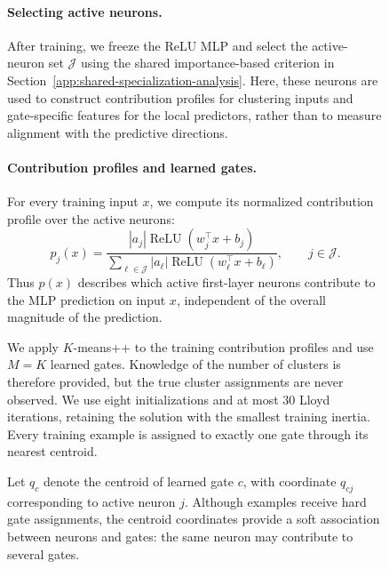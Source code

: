 \documentclass{article}
\newcounter{initialization}[section]
\begin{document}
\begin{figure}
\paragraph{Selecting active neurons.}
After training, we freeze the ReLU MLP and select the active-neuron set
\(\mathcal J\) using the shared importance-based criterion in
Section~\ref{app:shared-specialization-analysis}.
Here, these neurons are used to construct contribution profiles for
clustering inputs and gate-specific features for the local predictors,
rather than to measure alignment with the predictive directions.

\paragraph{Contribution profiles and learned gates.}
For every training input \(x\), we compute its normalized contribution profile
over the active neurons:
\begin{equation}
    p_j(x)
    =
    \frac{
        |a_j|\operatorname{ReLU}(w_j^\top x+b_j)
    }{
        \displaystyle
        \sum_{\ell\in\mathcal J}
        |a_\ell|\operatorname{ReLU}(w_\ell^\top x+b_\ell)
    },
    \qquad j\in\mathcal J.
    \label{eq:appendix-contribution-profile}
\end{equation}
Thus \(p(x)\) describes which active first-layer neurons contribute to the
MLP prediction on input \(x\), independent of the overall magnitude of the
prediction.

We apply \(K\)-means++ to the training contribution profiles and use
\(M=K\) learned gates. Knowledge of the number of clusters is therefore
provided, but the true cluster assignments are never observed. We use eight
initializations and at most 30 Lloyd iterations, retaining the solution with
the smallest training inertia. Every training example is assigned to exactly
one gate through its nearest centroid.

Let \(q_c\) denote the centroid of learned gate \(c\), with coordinate
\(q_{cj}\) corresponding to active neuron \(j\). Although examples receive
hard gate assignments, the centroid coordinates provide a soft association
between neurons and gates: the same neuron may contribute to several gates.


\end{figure}
\end{document}
